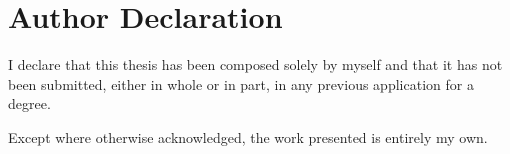 \chapter*{Author Declaration}
\label{declaration}

{\setlength{\parindent}{0pt}

I declare that this thesis has been composed solely by myself and that it has not been submitted, either in whole or in part, in any previous application for a degree.

Except where otherwise acknowledged, the work presented is entirely my own.

\vspace{4cm}

\thesisauthor{}

\thesisdate{}
}


